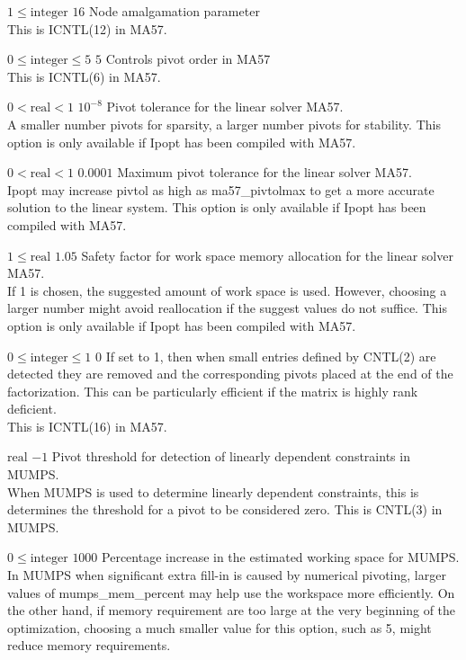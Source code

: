 %
{$1\leq\textrm{integer}$}%
{$16$}%
{Node amalgamation parameter\\
This is ICNTL(12) in MA57.}%
{}

%
{$0\leq\textrm{integer}\leq5$}%
{$5$}%
{Controls pivot order in MA57\\
This is ICNTL(6) in MA57.}%
{}

%
{$0<\textrm{real}<1$}%
{$10^{- 8}$}%
{Pivot tolerance for the linear solver MA57.\\
A smaller number pivots for sparsity, a larger number pivots for stability. This option is only available if Ipopt has been compiled with MA57.}%
{}

%
{$0<\textrm{real}<1$}%
{$0.0001$}%
{Maximum pivot tolerance for the linear solver MA57.\\
Ipopt may increase pivtol as high as ma57\_pivtolmax to get a more accurate solution to the linear system.  This option is only available if Ipopt has been compiled with MA57.}%
{}

%
{$1\leq\textrm{real}$}%
{$1.05$}%
{Safety factor for work space memory allocation for the linear solver MA57.\\
If 1 is chosen, the suggested amount of work space is used.  However, choosing a larger number might avoid reallocation if the suggest values do not suffice.  This option is only available if Ipopt has been compiled with MA57.}%
{}

%
{$0\leq\textrm{integer}\leq1$}%
{$0$}%
{If set to 1, then when small entries defined by CNTL(2) are detected they are removed and the corresponding pivots placed at the end of the factorization.  This can be particularly efficient if the matrix is highly rank deficient.\\
This is ICNTL(16) in MA57.}%
{}

%
{$\textrm{real}$}%
{$-1$}%
{Pivot threshold for detection of linearly dependent constraints in MUMPS.\\
When MUMPS is used to determine linearly dependent constraints, this is determines the threshold for a pivot to be considered zero.  This is CNTL(3) in MUMPS.}%
{}

%
{$0\leq\textrm{integer}$}%
{$1000$}%
{Percentage increase in the estimated working space for MUMPS.\\
In MUMPS when significant extra fill-in is caused by numerical pivoting, larger values of mumps\_mem\_percent may help use the workspace more efficiently.  On the other hand, if memory requirement are too large at the very beginning of the optimization, choosing a much smaller value for this option, such as 5, might reduce memory requirements.}%
{}


